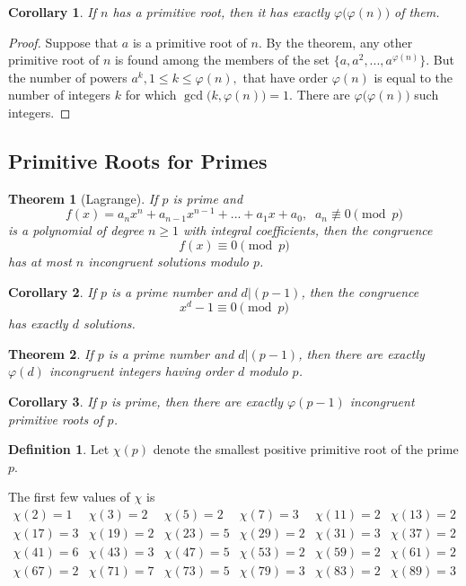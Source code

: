 \documentclass{article}
\newtheorem{theorem}{Theorem}[section]
\newtheorem{corollary}{Corollary}[theorem]
\theoremstyle{remark}
\theoremstyle{definition}
\newtheorem{definition}{Definition}[section]
\begin{document}
\begin{corollary}
If $n$ has a primitive root, then it has exactly $\varphi \big( \varphi(n) \big)$ of them. 
\end{corollary}
\begin{proof}
Suppose that $a$ is a primitive root of $n$. By the theorem, any other primitive root of $n$ is found among the members of the set $\{a, a^2, ..., a^{\varphi(n)}\}$. But the number of powers $a^k, 1 \leq k \leq \varphi(n),$ that have order $\varphi(n)$ is equal to the number of integers $k$ for which $\gcd\big(k, \varphi(n)\big) = 1$. There are $\varphi\big( \varphi(n)\big)$ such integers. 
\end{proof}

\subsection{Primitive Roots for Primes}

\begin{theorem}[Lagrange]
If $p$ is prime and 
\[f(x) = a_n x^n + a_{n-1} x^{n-1} + ... + a_1 x + a_0, \;\; a_n \not\equiv 0 \pmod{p}\]
is a polynomial of degree $n\geq 1$ with integral coefficients, then the congruence 
\[f(x) \equiv 0 \pmod{p}\]
has at most $n$ incongruent solutions modulo $p$.
\end{theorem}

\begin{corollary}
If $p$ is a prime number and $d|(p-1)$, then the congruence 
\[x^d - 1 \equiv 0 \pmod{p}\]
has exactly $d$ solutions. 
\end{corollary}

\begin{theorem}
If $p$ is a prime number and $d|(p-1)$, then there are exactly $\varphi(d)$ incongruent integers having order $d$ modulo $p$. 
\end{theorem}

\begin{corollary}
If $p$ is prime, then there are exactly $\varphi(p-1)$ incongruent primitive roots of $p$.
\end{corollary}

\begin{definition}
Let $\chi(p)$ denote the smallest positive primitive root of the prime $p$. 
\end{definition}

The first few values of $\chi$ is 
\[\begin{array}{cccccc}
    \chi(2) = 1 & \chi(3) = 2 & \chi(5) = 2 & \chi(7) = 3 & \chi(11) = 2 & \chi(13) = 2 \\
    \chi(17) = 3 & \chi(19) = 2 & \chi(23) = 5 & \chi(29) = 2 & \chi(31) = 3 & \chi(37) = 2 \\
    \chi(41) = 6 & \chi(43) = 3 & \chi(47) = 5 & \chi(53) = 2 & \chi(59) = 2 & \chi(61) = 2 \\
    \chi(67) = 2 & \chi(71) = 7 & \chi(73) = 5 & \chi(79) = 3 & \chi(83) = 2 & \chi(89) = 3 \\
\end{array}\]
\end{document}
